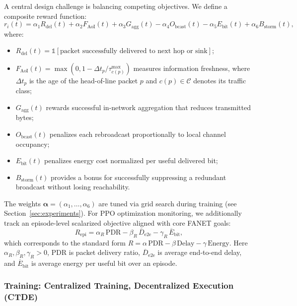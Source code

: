 \documentclass[5p,times]{elsarticle}
\begin{document}
A central design challenge is balancing competing objectives. We define a composite reward function:
\begin{equation}
\label{eq:reward}
r_i(t) = \alpha_1 R_{\mathrm{del}}(t) + \alpha_2 F_{\mathrm{AoI}}(t) + \alpha_3 G_{\mathrm{agg}}(t) - \alpha_4 O_{\mathrm{bcast}}(t) - \alpha_5 E_{\mathrm{bit}}(t) + \alpha_6 B_{\mathrm{storm}}(t),
\end{equation}
where:
\begin{itemize}
\item $R_{\mathrm{del}}(t) = \mathbb{1}[\text{packet successfully delivered to next hop or sink}]$;
\item $F_{\mathrm{AoI}}(t) = \max(0, 1 - \Delta t_p / \tau_{c(p)}^{\max})$ measures information freshness, where $\Delta t_p$ is the age of the head-of-line packet $p$ and $c(p) \in \mathcal{C}$ denotes its traffic class;
\item $G_{\mathrm{agg}}(t)$ rewards successful in-network aggregation that reduces transmitted bytes;
\item $O_{\mathrm{bcast}}(t)$ penalizes each rebroadcast proportionally to local channel occupancy;
\item $E_{\mathrm{bit}}(t)$ penalizes energy cost normalized per useful delivered bit;
\item $B_{\mathrm{storm}}(t)$ provides a bonus for successfully suppressing a redundant broadcast without losing reachability.
\end{itemize}
The weights $\boldsymbol{\alpha} = (\alpha_1, \dots, \alpha_6)$ are tuned via grid search during training (see Section~\ref{sec:experiments}).
For PPO optimization monitoring, we additionally track an episode-level scalarized objective aligned with core FANET goals:
\begin{equation}
\label{eq:reward_scalarized}
R_{\mathrm{epi}} = \alpha_{R}\,\mathrm{PDR} - \beta_{R}\,\overline{D}_{\mathrm{e2e}} - \gamma_{R}\,\overline{E}_{\mathrm{bit}},
\end{equation}
which corresponds to the standard form $R=\alpha\,\mathrm{PDR}-\beta\,\mathrm{Delay}-\gamma\,\mathrm{Energy}$. Here $\alpha_{R},\beta_{R},\gamma_{R} > 0$, $\mathrm{PDR}$ is packet delivery ratio, $\overline{D}_{\mathrm{e2e}}$ is average end-to-end delay, and $\overline{E}_{\mathrm{bit}}$ is average energy per useful bit over an episode.

\subsubsection{Training: Centralized Training, Decentralized Execution (CTDE)}
\end{document}
